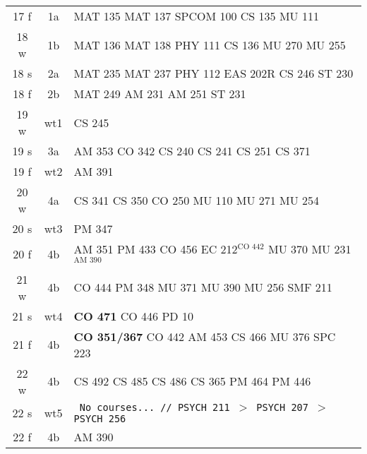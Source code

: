 \documentclass[convert]{standalone}
\begin{document}
\begin{tabular}{|c | c | l |}
	\hline
	17 f & 1a & MAT 135 \quad MAT 137 \quad SPCOM 100 \quad CS 135 \quad MU 111 \\
	18 w & 1b & MAT 136 \quad MAT 138 \quad PHY 111 \quad CS 136 \quad MU 270 \quad MU 255\\
	18 s & 2a & MAT 235 \quad MAT 237 \quad PHY 112 \quad EAS 202R \quad CS 246 \quad ST  230 \\
	18 f & 2b & MAT 249 \quad AM 231 \quad AM 251 \quad ST  231 \\
	19 w & wt1 & CS 245 \\
	19 s & 3a & AM 353 \quad CO 342 \quad CS 240 \quad CS 241 \quad CS 251 \quad CS 371 \\
	19 f & wt2 & AM 391 \\
	20 w & 4a & CS 341 \quad CS 350 \quad CO 250  \quad MU 110 \quad MU 271 \quad MU 254 \\
	20 s & wt3 & PM 347 \\
	20 f & 4b & AM 351  \quad PM 433  \quad CO 456 \quad EC 212$^{\scriptscriptstyle\text{CO 442}}$  \quad MU 370 \quad MU 231$^{\scriptscriptstyle\text{AM 390}}$  \\
	21 w & 4b & CO 444 \quad PM 348   \quad MU 371   \quad MU 390 \quad MU 256 \quad SMF 211 \\
	21 s & wt4 & {\color{red}\textbf{CO 471}} \quad CO 446 \quad PD 10  \\
	21 f & 4b &{\color{white} \textbf{CO 351/367}} \quad CO 442  \quad AM 453 \quad CS 466 \quad MU 376 \quad SPC 223      \\
	22 w & 4b & CS 492  \quad CS 485 \quad CS 486 \quad CS 365 \quad PM 464 \quad PM 446     \\
	22 s & wt5 & {\tt  \color{gray} No courses... // PSYCH 211 $>$ PSYCH 207 $>$ PSYCH 256} \\
	22 f & 4b &  AM 390   \\\hline

\end{tabular}
\end{document}
